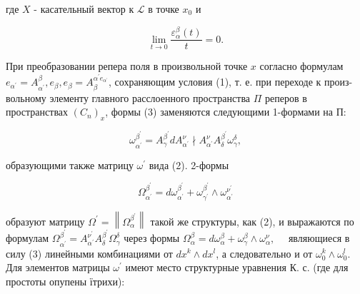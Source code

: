 \documentclass[10pt]{article}
\begin{document}
где $X$ - касательный вектор к $\mathscr{L}$ в точке $x_{0}$ и



\[

\lim _{t \rightarrow 0} \frac{\varepsilon_{\alpha}^{\beta}(t)}{t}=0 .

\]



При преобразовании репера поля в произвольной точке $x$ согласно формулам $e_{\alpha^{\prime}}=A_{\alpha^{\prime}}^{\beta}, e_{\beta}, e_{\beta}=A_{\beta}^{\alpha^{\prime} e_{\alpha^{\prime}}}$, сохраняющим условия (1), т. е. при переходе к произ- вольному элементу главного расслоенного пространства $\Pi$ реперов в пространствах $\left(C_{n}\right)_{x}$, формы (3) заменяются следующими 1-формами на П:



\[

\omega_{\alpha^{\prime}}^{\beta^{\prime}}=A_{\gamma}^{\beta^{\prime}} d A_{\alpha^{\prime}}^{\nu} \nmid A_{\alpha^{\prime}}^{\nu} A_{\delta}^{\beta^{\prime}} \omega_{\gamma}^{\delta},

\]



образующими также матрицу $\omega^{\prime}$ вида (2). 2-формы



\[

\Omega_{\alpha^{\prime}}^{\beta^{\prime}}=d \omega_{\alpha^{\prime}}^{\beta^{\prime}}+\omega_{\gamma^{\prime}}^{\beta^{\prime}} \wedge \omega_{\alpha^{\prime}}^{\nu^{\prime}}

\]



образуют матрицу $\Omega^{\prime}=\left\|\Omega_{\alpha}^{\beta^{\prime}}\right\|$ такой же структуры, как (2), и выражаются по формулам $\Omega_{\alpha^{\prime}}^{\beta^{\prime}}=A_{\alpha^{\prime}}^{\nu^{\prime}} A_{\delta}^{\beta^{\prime}} \Omega_{\gamma}^{\delta}$ через формы $\Omega_{\alpha}^{\beta}=d \omega_{\alpha}^{\beta}+\omega_{\gamma}^{\beta} \wedge \omega_{\alpha}^{\nu}, \quad$ являющиеся в силу (3) линейными комбинациями от $d x^{k} \wedge d x^{l}$, а следовательно и от $\omega_{0}^{k} \wedge \omega_{0}^{l}$. Для элементов матрицы $\omega^{\prime}$ имеют место структурные уравнения $К$. с. (где для простоты опупены їтрихи):
\end{document}
